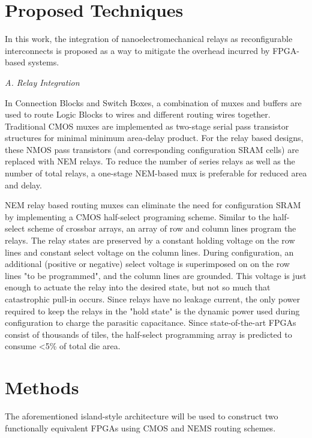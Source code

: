 \documentclass[twoside,twocolumn]{article}
\begin{document}
\section{Proposed Techniques}\label{sec:proposed}

In this work, the integration of nanoelectromechanical relays as reconfigurable interconnects is proposed as a way to mitigate the overhead incurred by FPGA-based systems. 

\textit{A. Relay Integration}

In Connection Blocks and Switch Boxes, a combination of muxes and buffers are used to route Logic Blocks to wires and different routing wires together. Traditional CMOS muxes are implemented as two-stage serial pass transistor structures for minimal minimum area-delay product. For the relay based designs, these NMOS pass transistors (and corresponding configuration SRAM cells) are replaced with NEM relays. To reduce the number of series relays as well as the number of total relays, a one-stage NEM-based mux is preferable for reduced area and delay\cite{chen_efficient_2010}.

NEM relay based routing muxes can eliminate the need for configuration SRAM by implementing a CMOS half-select programing scheme\cite{chen_efficient_2010}. Similar to the half-select scheme of crossbar arrays, an array of row and column lines program the relays. The relay states are preserved by a constant holding voltage on the row lines and constant select voltage on the column lines. During configuration, an additional (positive or negative) select voltage is superimposed on on the row lines "to be programmed", and the column lines are grounded. This voltage is just enough to actuate the relay into the desired state, but not so much that catastrophic pull-in occurs. Since relays have no leakage current, the only power required to keep the relays in the "hold state" is the dynamic power used during configuration to charge the parasitic capacitance. Since state-of-the-art FPGAs consist of thousands of tiles, the half-select programming array is predicted to consume <5\% of total die area.


\section{Methods}
The aforementioned island-style architecture will be used to construct two functionally equivalent FPGAs using CMOS and NEMS routing schemes.
\end{document}
